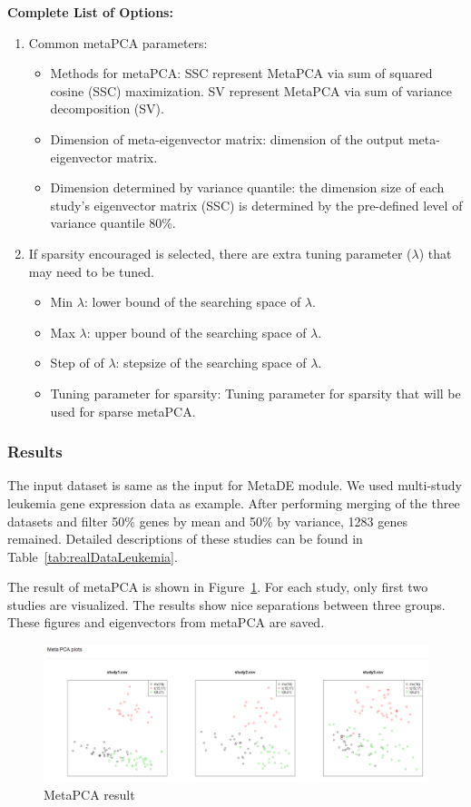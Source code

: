 \textbf{Complete List of Options:} 
\begin{enumerate}
\item Common metaPCA parameters: 

\begin{itemize}
\item Methods for metaPCA:
SSC represent MetaPCA via sum of squared cosine (SSC) maximization.
SV represent MetaPCA via sum of variance decomposition (SV).
\item Dimension of meta-eigenvector matrix: dimension of the output meta-eigenvector matrix.
\item Dimension determined by variance quantile:
the dimension size of each study's eigenvector matrix (SSC) is determined  by the pre-defined level of variance quantile 80\%.
\end{itemize}

\item If sparsity encouraged is selected, there are extra tuning parameter ($\lambda$) that may need to be tuned.

\begin{itemize}
\item  Min $\lambda$: lower bound of the searching space of $\lambda$.
\item Max $\lambda$: upper bound of the searching space of $\lambda$.
\item Step of of $\lambda$: stepsize of the searching space of $\lambda$.
\item Tuning parameter for sparsity: Tuning parameter for sparsity that will be used for sparse metaPCA.
\end{itemize}


\end{enumerate}


\subsubsection{Results}
The input dataset is same as the input for MetaDE module.
We used multi-study leukemia gene expression data as example.
After performing merging of the three datasets and filter 50\% genes by mean and 50\% by variance, 1283 genes remained.
Detailed descriptions of these studies can be found in Table~\ref{tab:realDataLeukemia}. 

The result of metaPCA is shown in Figure~\ref{fig:metaPCAresult}.
For each study, only first two studies are visualized.
The results show nice separations between three groups.
These figures and eigenvectors from metaPCA are saved.

\begin{figure}[H]
\begin{center}
\includegraphics[scale=0.3]{./figure/metaPCA/metaPCA}
\caption{MetaPCA result}
\label{fig:metaPCAresult}
\end{center}
\end{figure}

